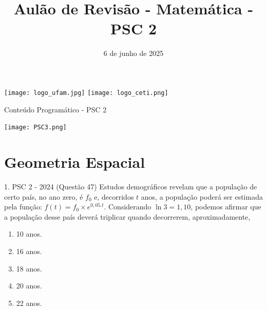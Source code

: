 \documentclass[aspectratio=169]{beamer}
\title[CETi Gilberto Mestrinho]{Aulão de Revisão - Matemática - PSC 2}
\date{6 de junho de 2025}
\newif\ifusarcorvermelha
\newcommand{\vermelho}[1]{%
    \ifusarcorvermelha
        {\color{red}#1}%
    \else
        #1%
    \fi
}
\begin{document}
\justifying
\onehalfspacing

\begin{frame}
    \begin{titlepage}
    \centering
    \vspace*{1cm} %
    
    \noindent%
    \hspace*{0.3\paperwidth}%
    \texttt{[image: logo\_ufam.jpg]}%
    \hfill%
    \texttt{[image: logo\_ceti.png]}%
    \hspace*{0.3\paperwidth}%
    
    \vspace{0.1cm} %

    \vspace{1cm}
    
    \vfill %
    \end{titlepage}
\end{frame}

\begin{frame}{Conteúdo Programático - PSC 2}

    \begin{center}
        \texttt{[image: PSC3.png]}
    \end{center}
    
\end{frame}

\section{Geometria Espacial}

    \begin{frame}{1. PSC 2 - 2024 (Questão 47)}
        Estudos demográficos revelam que a população de certo país, no ano zero, é $f_{0}$ e, decorridos $t$ anos, a população poderá ser estimada pela função: $f(t)=f_{0} \times  e^{0,05 . t}$. Considerando $\ln{3}=1,10$, podemos afirmar que a população desse país deverá triplicar quando decorrerem, aproximadamente,

            \begin{enumerate}[a]
                \item 10 anos.
                \item 16 anos.
                \item 18 anos.
                \item 20 anos.
                \item \vermelho{22 anos.} %
            \end{enumerate}
            
    \end{frame}
\end{document}
